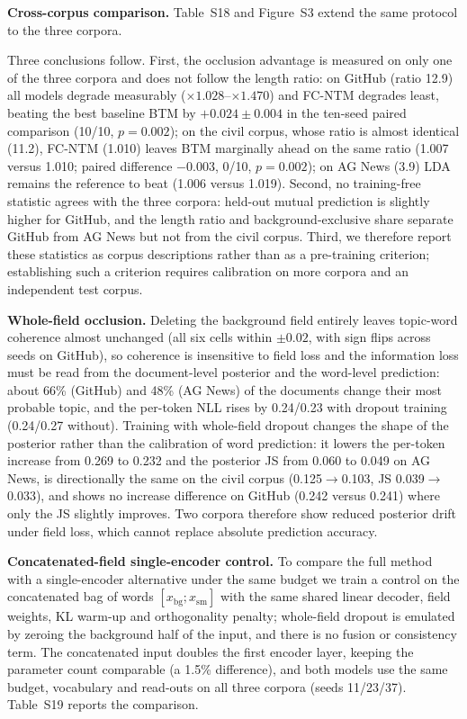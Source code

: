 \documentclass[Journal,letterpaper,NoLists]{ascelike-new}
\begin{document}
\noindent\textbf{Cross-corpus comparison.} Table~S18 and Figure~S3 extend the same protocol to the three
corpora.

Three conclusions follow. First, the occlusion advantage is measured on only one of the three
corpora and does not follow the length ratio: on GitHub (ratio 12.9) all models degrade measurably
($\times1.028$--$\times1.470$) and FC-NTM degrades least, beating the best baseline BTM by
$+0.024\pm0.004$ in the ten-seed paired comparison (10/10, $p=0.002$); on the civil corpus, whose
ratio is almost identical (11.2), FC-NTM (1.010) leaves BTM marginally ahead on the same ratio (1.007 versus 1.010; paired difference $-0.003$, 0/10, $p=0.002$); on AG News (3.9) LDA remains the reference to beat (1.006 versus 1.019).
Second, no training-free statistic agrees with the three corpora: held-out mutual prediction is
slightly higher for GitHub, and the length ratio and background-exclusive share separate GitHub
from AG News but not from the civil corpus. Third, we therefore report these statistics as corpus
descriptions rather than as a pre-training criterion; establishing such a criterion requires
calibration on more corpora and an independent test corpus.

\noindent\textbf{Whole-field occlusion.} Deleting the background field entirely leaves topic-word coherence almost unchanged (all six cells
within $\pm0.02$, with sign flips across seeds on GitHub), so coherence is insensitive to field
loss and the information loss must be read from the document-level posterior and the word-level
prediction: about 66\% (GitHub) and 48\% (AG News) of the documents change their most probable
topic, and the per-token NLL rises by 0.24/0.23 with dropout training (0.24/0.27 without).
Training with whole-field dropout changes the shape of the posterior rather than the calibration of
word prediction: it lowers the per-token increase from 0.269 to 0.232 and the posterior JS from
0.060 to 0.049 on AG News, is directionally the same on the civil corpus
(0.125$\to$0.103, JS 0.039$\to$0.033), and shows no increase difference on GitHub
(0.242 versus 0.241) where only the JS slightly improves. Two corpora therefore show reduced
posterior drift under field loss, which cannot replace absolute prediction accuracy.

\noindent\textbf{Concatenated-field single-encoder control.} To compare the full method with a single-encoder alternative under the same budget we train a
control on the concatenated bag of words $[x_{\mathrm{bg}};x_{\mathrm{sm}}]$ with the same shared
linear decoder, field weights, KL warm-up and orthogonality penalty; whole-field dropout is
emulated by zeroing the background half of the input, and there is no fusion or consistency
term. The concatenated input doubles the first encoder layer, keeping the parameter count
comparable (a 1.5\% difference), and both models use the same budget, vocabulary and read-outs
on all three corpora (seeds 11/23/37).
Table~S19 reports the comparison.
\end{document}
